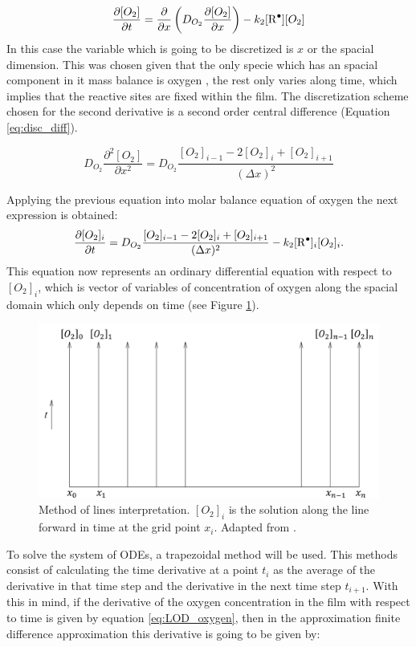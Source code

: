 \begin{refsection}
\begin{equation*}
     \frac{\partial [O_2]}{\partial t}= \frac{\partial}{\partial x} \left(D_{O_2}\frac{\partial [O_2] }{\partial x}\right) -k_2[\ce{R^.}][O_2]
\end{equation*}
In this case the variable which is going to be discretized is $x$ or the spacial dimension. This was chosen given that the only  specie which has an spacial component in it mass balance is oxygen , the rest only varies along time, which implies that the reactive sites are fixed within the film. The discretization scheme chosen for the second derivative is a second order central difference  (Equation \ref{eq:disc_diff}).

\begin{equation}
    D_{O_2}\frac{\partial^2 [O_2]}{\partial x^2}= D_{O_2} \frac{[O_2]_{i-1}-2[O_2]_{i}+[O_2]_{i+1}}{(\Delta x)^2}
    \label{eq:disc_diff}
\end{equation}

Applying the previous equation into molar balance equation of oxygen the next expression is obtained:
\begin{equation}
     \frac{\partial [O_2]_i}{\partial t}=  D_{O_2} \frac{[O_2]_{i-1}-2[O_2]_{i}+[O_2]_{i+1}}{(\Delta x)^2} -k_2[\ce{R^.}]_i[O_2]_i.
     \label{eq:LOD_oxygen}
\end{equation}
This equation now represents an ordinary differential equation with respect to $[O_2]_i$, which is  vector of variables of concentration of oxygen along the spacial domain which only depends on time (see Figure \ref{fig:LOD_diagram}). 

\begin{figure}[ht]
    \centering
    \includegraphics[width=0.7 \linewidth]{Documento_Latex/Imagenes/LOD.png}
    \caption{Method of lines interpretation. $[O_2]_i$ is the solution along the line forward in time at the grid point $x_i$. Adapted from \cite{LeVeque2007FiniteProblems}.}
    \label{fig:LOD_diagram}
\end{figure}

To solve the system of ODEs, a trapezoidal method will be used. This methods consist of calculating the time derivative at a point $t_i$ as the average of the derivative in that time step and the derivative in the next time step $t_{i+1}$. With this in mind, if the derivative of the oxygen concentration in the film with respect to time is given by equation \ref{eq:LOD_oxygen}, then in the approximation finite difference approximation this derivative is going to be given by:


\end{refsection}
